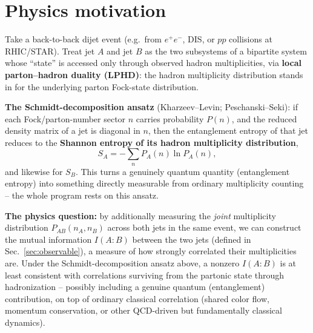 \documentclass[11pt]{article}
\begin{document}
\tableofcontents

\section{Physics motivation}
\label{sec:motivation}

Take a back-to-back dijet event (e.g.\ from $e^+e^-$, DIS, or $pp$
collisions at RHIC/STAR). Treat jet $A$ and jet $B$ as the two subsystems
of a bipartite system whose ``state'' is accessed only through observed
hadron multiplicities, via \textbf{local parton--hadron duality (LPHD)}:
the hadron multiplicity distribution stands in for the underlying parton
Fock-state distribution.

\textbf{The Schmidt-decomposition ansatz} (Kharzeev--Levin;
Peschanski--Seki): if each Fock/parton-number sector $n$ carries
probability $P(n)$, and the reduced density matrix of a jet is diagonal in
$n$, then the entanglement entropy of that jet reduces to the
\textbf{Shannon entropy of its hadron multiplicity distribution},
\begin{equation}
S_A = -\sum_n P_A(n)\ln P_A(n),
\end{equation}
and likewise for $S_B$. This turns a genuinely quantum quantity
(entanglement entropy) into something directly measurable from ordinary
multiplicity counting -- the whole program rests on this ansatz.

\textbf{The physics question:} by additionally measuring the \emph{joint}
multiplicity distribution $P_{AB}(n_A,n_B)$ across both jets in the same
event, we can construct the mutual information $I(A{:}B)$ between the two
jets (defined in Sec.~\ref{sec:observable}), a measure of how strongly
correlated their multiplicities are. Under the Schmidt-decomposition
ansatz above, a nonzero $I(A{:}B)$ is at least consistent with
correlations surviving from the partonic state through hadronization --
possibly including a genuine quantum (entanglement) contribution, on top
of ordinary classical correlation (shared color flow, momentum
conservation, or other QCD-driven but fundamentally classical dynamics).
\end{document}
